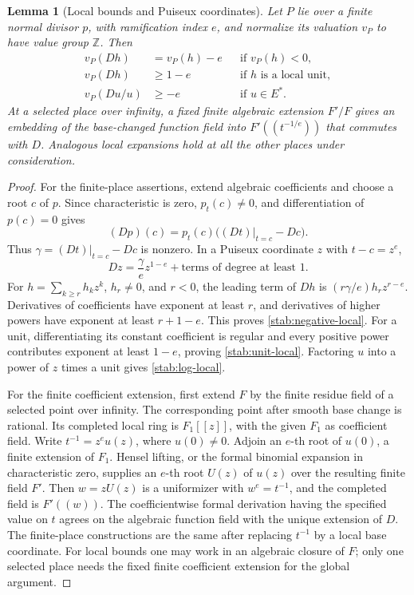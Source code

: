 \documentclass[11pt,a4paper]{article}
\newtheorem{lemma}[theorem]{Lemma}
\theoremstyle{definition}
\theoremstyle{remark}
\numberwithin{equation}{section}
\begin{document}
\begin{lemma}[Local bounds and Puiseux coordinates]\label{stab:local}
Let $P$ lie over a finite normal divisor $p$, with ramification index
$e$, and normalize its valuation $v_P$ to have value group $\mathbb Z$.
Then
\begin{align}
 v_P(Dh)&=v_P(h)-e &&\text{if }v_P(h)<0,\label{stab:negative-local}\\
 v_P(Dh)&\geq1-e &&\text{if }h\text{ is a local unit},\label{stab:unit-local}\\
 v_P(Du/u)&\geq-e &&\text{if }u\in E^*.\label{stab:log-local}
\end{align}
At a selected place over infinity, a fixed finite algebraic extension
$F'/F$ gives an embedding of the base-changed function field into
$F'((t^{-1/e}))$ that commutes with $D$.  Analogous local expansions
hold at all the other places under consideration.
\end{lemma}
\begin{proof}
For the finite-place assertions, extend algebraic coefficients and
choose a root $c$ of $p$.  Since characteristic is zero,
$p_t(c)\ne0$, and differentiation of $p(c)=0$ gives
\[
 (Dp)(c)=p_t(c)\bigl((Dt)|_{t=c}-Dc\bigr).
\]
Thus $\gamma=(Dt)|_{t=c}-Dc$ is nonzero.  In a Puiseux coordinate
$z$ with $t-c=z^e$,
\[
 Dz=\frac{\gamma}{e}z^{1-e}+\text{terms of degree at least }1.
\]
For $h=\sum_{k\geq r}h_kz^k$, $h_r\ne0$, and $r<0$, the leading
term of $Dh$ is $(r\gamma/e)h_rz^{r-e}$.  Derivatives of coefficients
have exponent at least $r$, and derivatives of higher powers have
exponent at least $r+1-e$.  This proves
\eqref{stab:negative-local}.  For a unit, differentiating its constant
coefficient is regular and every positive power contributes exponent
at least $1-e$, proving \eqref{stab:unit-local}.  Factoring $u$ into a
power of $z$ times a unit gives \eqref{stab:log-local}.

For the finite coefficient extension, first extend $F$ by the finite
residue field of a selected point over infinity.  The corresponding
point after smooth base change is rational.  Its completed local ring
is $F_1[[z]]$, with the given $F_1$ as coefficient field.  Write
$t^{-1}=z^e u(z)$, where $u(0)\ne0$.  Adjoin an $e$-th root of
$u(0)$, a finite extension of $F_1$.  Hensel lifting, or the formal
binomial expansion in characteristic zero, supplies an $e$-th root
$U(z)$ of $u(z)$ over the resulting finite field $F'$.  Then
$w=zU(z)$ is a uniformizer with $w^e=t^{-1}$, and the completed field
is $F'((w))$.  The coefficientwise formal derivation having the
specified value on $t$ agrees on the algebraic function field with the
unique extension of $D$.  The finite-place constructions are the same
after replacing $t^{-1}$ by a local base coordinate.  For local bounds
one may work in an algebraic closure of $F$; only one selected place
needs the fixed finite coefficient extension for the global argument.
\end{proof}
\end{document}
